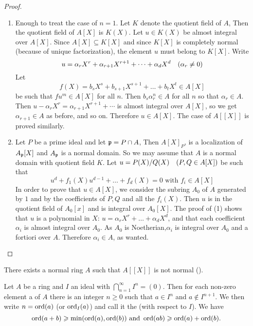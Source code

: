 \documentclass[../main]{subfiles}
\begin{document}
\begin{proof}
\begin{enumerate}[label = (\arabic*)]
    \item Enough to treat the case of $n= 1$. Let $K$ denote the quotient field of $A$, Then the quotient field of $A[X]$ is $K(X)$. Let $u\in K(X)$ be almost integral over $A[X]$. Since $A[X]\subseteq K[X]$ and since $K[X]$ is completely normal (because of unique factorization), the element $u$ must belong to $K[X]$. Write \[u=\alpha_r X^r +\alpha_{r+1}X^{r+1}+\dots+\alpha_dX^d\for{\alpha_r\neq 0}\]
    Let \[f(X)=b_sX^s+b_{s+1}X^{s+1}+\dots+b_tX^t\in A[X]\] be such that $fu^m\in A[X]$ for all $n$. Then $b_s\alpha_r^n \in A$ for all $n$ so that $\alpha_r\in A$. Then $u-\alpha_rX^r = \alpha_{r+1}X^{r+1}+\cdots$ is almost integral over $A[X]$, so we get $\alpha_{r+1}\in A$ as before, and so on. Therefore $u\in A[X]$. The case of $A[[X]]$ is proved similarly.
    \item Let $P$ be a prime ideal and let $\mathfrak{p} = P\cap A$, Then $A[X]_P$, is a localization of $A_{\mathfrak{p}}[X]$ and $A_{\mathfrak{p}}$ is a normal domain. So we may assume that $A$ is a normal domain with quotient field $K$. Let $u= P(X)/Q(X) \for{P,Q \in A[X]}$ be such that \[u^d+f_1(X)u^{d-1}+\dots+f_d(X)=0\text{ with }f_i\in A[X]\] In order to prove that $u\in A[X]$, we consider the subring $A_0$ of $A$ generated by $1$ and by the coefficients of $P,Q$ and all the $f_i(X)$. Then $u$ is in the quotient field of $A_0 [x]$ and is integral over $A_0 [X]$. The proof of (1) shows that $u$ is a polynomial in $X$: $u = \alpha_r X^r +\dots + \alpha_dX^d$, and that each coefficient $\alpha_i$ is almost integral over $A_0$. As $A_0$ is Noetherian,$\alpha_i$ is integral over $A_0$ and a fortiori over $A$. Therefore $\alpha_i\in A$, as wanted.
\end{enumerate}
\end{proof}

\begin{remark}
There exists a normal ring $A$ such that $A[[X]]$ is
not normal (\cite{seidenberg1966derivations}).
\end{remark}

\newparagraph Let $A$ be a ring and $I$ an ideal with $\bigcap_{n=1}^\infty I^n=(0)$. Then for each non-zero element a of $A$ there is an integer $n \geq 0$ such that $a \in I^n$ and $a \notin I^{n+1}$. We then write $n=\operatorname{ord} (a)$ (or $\operatorname{ord}_I(a)$) and call it the  (with respect to $I$).
We have \[\operatorname{ord}(a+b)\geqslant \min (\operatorname{ord}(a),\operatorname{ord}(b))\text{ and } \operatorname{ord}(ab)\geqslant \operatorname{ord}(a)+\operatorname{ord}(b).\]
\end{document}
